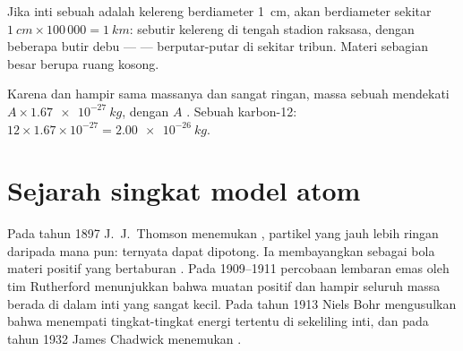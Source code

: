 \begin{example}\label{ex:g9:inside-the-atom:marble}
Jika inti sebuah  adalah kelereng berdiameter \qty{1}{cm}, 
akan berdiameter sekitar $\qty{1}{cm} \times 100\,000 = \qty{1}{km}$:
sebutir kelereng di tengah stadion raksasa, dengan beberapa butir debu
---  --- berputar-putar di sekitar tribun. Materi
sebagian besar berupa ruang kosong.
\end{example}

\begin{method}\label{met:g9:inside-the-atom:mass}
Karena  dan  hampir sama massanya dan  sangat
ringan, massa sebuah  mendekati $A \times
\qty{1.67e-27}{kg}$, dengan $A$ . Sebuah  karbon-12:
$12 \times 1.67 \times 10^{-27} = \qty{2.00e-26}{kg}$.
\end{method}

\section{Sejarah singkat model atom}

\begin{history}
Pada tahun 1897 J.~J.~Thomson menemukan , partikel yang jauh
lebih ringan daripada  mana pun: ternyata  dapat dipotong. Ia
membayangkan  sebagai bola materi positif yang bertaburan
. Pada 1909--1911 percobaan lembaran emas oleh tim Rutherford
menunjukkan bahwa muatan positif dan hampir seluruh massa berada di
dalam inti yang sangat kecil. Pada tahun 1913 Niels Bohr mengusulkan
bahwa  menempati tingkat-tingkat energi tertentu di
sekeliling inti, dan pada tahun 1932 James Chadwick menemukan .
\end{history}

